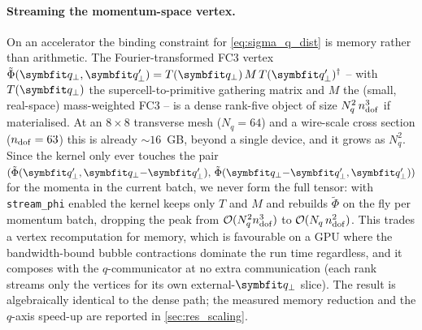 \paragraph{Streaming the momentum-space vertex.}
On an accelerator the binding constraint for
\cref{eq:sigma_q_dist} is memory rather than arithmetic. The
Fourier-transformed FC3 vertex
$\tilde\Phi(\qp,\qp')=T(\qp)\,M\,T(\qp')^{\dagger}$ -- with $T(\qp)$
the supercell-to-primitive gathering matrix and $M$ the (small,
real-space) mass-weighted FC3 -- is a dense rank-five object of size
$N_q^{2}\,n_{\mathrm{dof}}^{3}$ if materialised. At an $8\times8$ transverse mesh
($N_q=64$) and a wire-scale cross section ($n_{\mathrm{dof}}=63$) this is already
$\sim 16$~GB, beyond a single device, and it grows as $N_q^{2}$. Since
the kernel only ever touches the pair
$(\tilde\Phi(\qp',\qp{-}\qp'),\,\tilde\Phi(\qp{-}\qp',\qp'))$ for the
momenta in the current batch, we never form the full tensor: with
\texttt{stream\_phi} enabled the kernel keeps only $T$ and $M$ and
rebuilds $\tilde\Phi$ on the fly per momentum batch, dropping the peak
from $\mathcal{O}(N_q^{2}n_{\mathrm{dof}}^{3})$ to $\mathcal{O}(N_q\,n_{\mathrm{dof}}^{2})$. This trades a
vertex recomputation for memory, which is favourable on a GPU where the
bandwidth-bound bubble contractions dominate the run time regardless,
and it composes with the $q$-communicator at no extra communication
(each rank streams only the vertices for its own external-$\qp$ slice).
The result is algebraically identical to the dense path; the measured
memory reduction and the $q$-axis speed-up are reported in
\cref{sec:res_scaling}.
